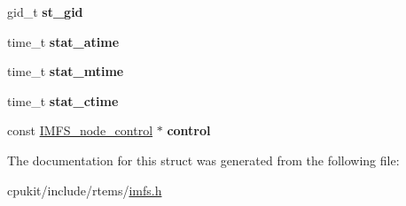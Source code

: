 \begin{DoxyCompactItemize}
gid\+\_\+t {\bfseries st\+\_\+gid}
\item 
\mbox{\label{structIMFS__jnode__tt_ac61f0a6f87c56cb2c7015f331a25b33a}} 
time\+\_\+t {\bfseries stat\+\_\+atime}
\item 
\mbox{\label{structIMFS__jnode__tt_aaaadfdf15bea10f40abdb78724b6f672}} 
time\+\_\+t {\bfseries stat\+\_\+mtime}
\item 
\mbox{\label{structIMFS__jnode__tt_a693790454f284c3fe16fdee80d50dcad}} 
time\+\_\+t {\bfseries stat\+\_\+ctime}
\item 
\mbox{\label{structIMFS__jnode__tt_adf43b50ff7ef3cd3385a37bfd2f732a5}} 
const \mbox{\hyperlink{structIMFS__node__control}{I\+M\+F\+S\+\_\+node\+\_\+control}} $\ast$ {\bfseries control}
\end{DoxyCompactItemize}


The documentation for this struct was generated from the following file\+:\begin{DoxyCompactItemize}
\item 
cpukit/include/rtems/\mbox{\hyperlink{imfs_8h}{imfs.\+h}}\end{DoxyCompactItemize}
